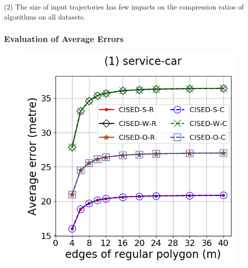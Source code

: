 \ni(2) The size of input trajectories has few impacts on the compression ratios of \lsa algorithms on all datasets.





\subsubsection{Evaluation of Average Errors}



\begin{figure}[tb!]
	\centering
	\includegraphics[scale = 0.30]{Figures/Exp-M-e-60-error-service.png}

\end{figure}
